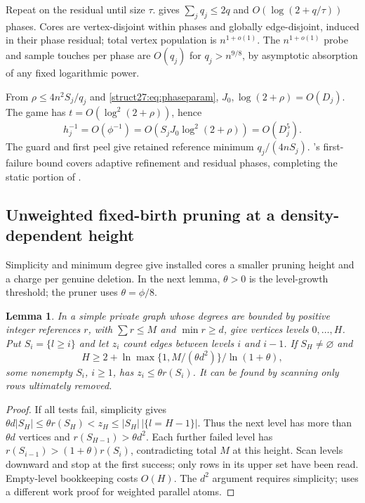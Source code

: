 \documentclass[11pt]{article}
\newtheorem{lemma}[theorem]{Lemma}
\theoremstyle{remark}
\begin{document}
Repeat on the residual until size $\tau$.
 gives $\sum_jq_j\le2q$ and $O(\log(2+q/\tau))$
phases.
Cores are vertex-disjoint within phases and globally edge-disjoint, induced in
their phase residual; total vertex population is $n^{1+o(1)}$.
The $n^{1+o(1)}$ probe and sample touches per phase are $O(q_j)$ for
$q_j>n^{9/8}$, by asymptotic absorption of any fixed logarithmic power.

From $\rho\le4n^2S_j/q_j$ and \eqref{struct27:eq:phaseparam},
$J_0,\log(2+\rho)=O(D_j)$.
The game has $t=O(\log^2(2+\rho))$, hence
\[
 h_j^{-1}=O(\phi^{-1})
 =O(S_jJ_0\log^2(2+\rho))=O(D_j^5).
\]
The guard and first peel give retained reference minimum $q_j/(4nS_j)$.
's first-failure bound covers adaptive refinement and
residual phases, completing the static portion of .

\subsection{Unweighted fixed-birth pruning at a density-dependent height}

Simplicity and minimum degree give installed cores a smaller pruning height and
a charge per genuine deletion.
In the next lemma, $\theta>0$ is the level-growth threshold; the pruner uses
$\theta=\phi/8$.

\begin{lemma}\label{struct27:lem:densityheight}
In a simple private graph whose degrees are bounded by positive integer
references $r$, with $\sum r\le M$ and $\min r\ge d$, give vertices levels
$0,\ldots,H$.
Put $S_i=\{l\ge i\}$ and let $z_i$ count edges between levels $i$ and $i-1$.
If $S_H\ne\varnothing$ and
\[
 H\ge2+ \ln\max\{1,M/(\theta d^2)\}/\ln(1+\theta) ,
\]
some nonempty $S_i$, $i\ge1$, has $z_i\le\theta r(S_i)$.
It can be found by scanning only rows ultimately removed.
\end{lemma} \begin{proof} If all tests fail, simplicity gives $\theta
d|S_H|\le\theta r(S_H)<z_H \le|S_H|\,|\{l=H-1\}|$.
Thus the next level has more than $\theta d$ vertices and $r(S_{H-1})>\theta
d^2$.
Each further failed level has $r(S_{i-1})>(1+\theta)r(S_i)$, contradicting total
$M$ at this height.
Scan levels downward and stop at the first success; only rows in its upper set
have been read.
Empty-level bookkeeping costs $O(H)$.
The $d^2$ argument requires simplicity;  uses
a different work proof for weighted parallel atoms.
\end{proof}
\end{document}
